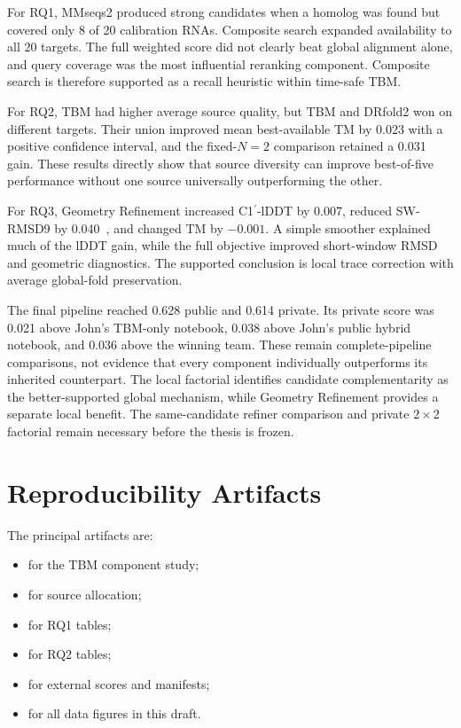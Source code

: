 \documentclass[12pt,a4paper,oneside]{report}
\newcommand{\cprime}{C1$^{\prime}$}
\newcommand{\angstrom}{\text{\AA}}
\begin{document}
For RQ1, MMseqs2 produced strong candidates when a homolog was found but covered only 8
of 20 calibration RNAs. Composite search expanded availability to all 20 targets. The
full weighted score did not clearly beat global alignment alone, and query coverage was
the most influential reranking component. Composite search is therefore supported as a
recall heuristic within time-safe TBM.

For RQ2, TBM had higher average source quality, but TBM and DRfold2 won on different
targets. Their union improved mean best-available TM by 0.023 with a positive
confidence interval, and the fixed-$N=2$ comparison retained a 0.031 gain. These
results directly show that source diversity can improve best-of-five performance without
one source universally outperforming the other.

For RQ3, Geometry Refinement increased \cprime{}-lDDT by 0.007, reduced SW-RMSD9 by
0.040~\angstrom{}, and changed TM by $-0.001$. A simple smoother explained much
of the lDDT gain, while the full objective improved short-window RMSD and geometric
diagnostics. The supported conclusion is local trace correction with average global-fold
preservation.

The final pipeline reached 0.628 public and 0.614 private. Its private score was 0.021
above John's TBM-only notebook, 0.038 above John's public hybrid notebook, and 0.036 above
the winning team. These remain complete-pipeline comparisons, not evidence that every
component individually outperforms its inherited counterpart. The local factorial
identifies candidate complementarity as the better-supported global mechanism, while
Geometry Refinement provides a separate local benefit. The same-candidate refiner
comparison and private $2\times2$ factorial remain necessary before the thesis is frozen.

\appendix

\chapter{Reproducibility Artifacts}
\label{app:repro_en}

The principal artifacts are:
\begin{itemize}
  \item {} for the TBM component study;
  \item {} for source allocation;
  \item {} for RQ1 tables;
  \item {} for RQ2 tables;
  \item {} for external scores and manifests;
  \item {} for all data figures in this draft.
\end{itemize}
\end{document}
